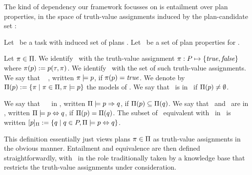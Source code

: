 The kind of dependency our framework focusses on is entailment over
plan properties, in the space of truth-value assignments induced by
the plan-candidate set \plans:

\begin{definition}[Entailment]
Let \task\ be a task with induced set of plans \plans. Let \props\ be
a set of plan properties for \task.

Let $\pi \in \Pi$. We identify \plan\ with the truth-value
assignment $\pi : P \mapsto \{\mathit{true}, \mathit{false}\}$ where
$\pi(p) := p(\tau,\pi)$. We identify \plans\ with the set
of such truth-value assignments. We say that
\plan\  \prop, written $\pi \models p$, if
$\pi(p) = \mathit{true}$. We denote by $\Pi(p) :=
\{\pi \mid \pi \in \Pi, \pi \models p\}$ the models of
\prop. We say that \prop\ is  in \plans\ if
$\Pi(p) \neq \emptyset$.

We say that \prop\  \propq\ in \plans, written
$\Pi \models p \Rightarrow q$, if $\Pi(p)
\subseteq \Pi(q)$.
%
We say that \prop\ and \propq\ are  in \plans,
written $\Pi \models p \Leftrightarrow q$, if $\Pi(p) =
\Pi(q)$. The subset of \props\ equivalent with
\prop\ in \plans\ is written $[p]_{\Pi} := \{q \mid
q \in P, \Pi \models p \Leftrightarrow q\}$.
\end{definition}

This definition essentially just views plans $\pi \in \Pi$ as
truth-value assignments in the obvious manner. Entailment and
equivalence are then defined straightforwardly, with \plans\ in the
role traditionally taken by a knowledge base that restricts the
truth-value assignments under consideration.

